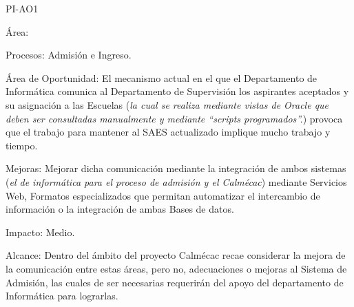 
\begin{AreaOportunidad}{PI-AO1}
	\item[Área:] 
	\item[Procesos:] Admisión e Ingreso.
	\item[Área de Oportunidad:] El mecanismo actual en el que el Departamento de Informática comunica al Departamento de Supervisión los aspirantes aceptados y su asignación a las Escuelas ({\em la cual se realiza mediante vistas de Oracle que deben ser consultadas manualmente y mediante ``scripts programados''.}) provoca que el trabajo para mantener al SAES actualizado implique mucho trabajo y tiempo.
	\item[Mejoras:] Mejorar dicha comunicación mediante la integración de ambos sistemas ({\em el de informática para el proceso de admisión y el Calmécac}) mediante Servicios Web, Formatos especializados que permitan automatizar el intercambio de información o la integración de ambas Bases de datos.
	\item[Impacto:] Medio.
	\item[Alcance:] Dentro del ámbito del proyecto Calmécac recae considerar la mejora de la comunicación entre estas áreas, pero no, adecuaciones o mejoras al Sistema de Admisión, las cuales de ser necesarias requerirán del apoyo del departamento de Informática para lograrlas.
\end{AreaOportunidad}


